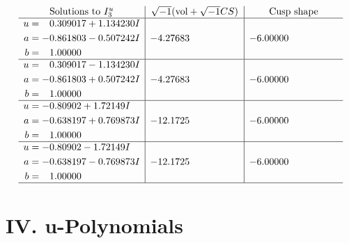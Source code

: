 \documentclass[1p]{elsarticle_modified}
\theoremstyle{definition}
\newcommand{\I}{\sqrt{-1}}
\begin{document}
$$\begin{array}{c|c|c}  
\text{Solutions to }I^u_{3}& \I (\text{vol} + \sqrt{-1}CS) & \text{Cusp shape}\\
 \hline 
\begin{aligned}
u &= \phantom{-}0.309017 + 1.134230 I \\
a &= -0.861803 - 0.507242 I \\
b &= \phantom{-}1.00000\phantom{ +0.000000I}\end{aligned}
 & -4.27683\phantom{ +0.000000I} & -6.00000\phantom{ +0.000000I} \\ \hline\begin{aligned}
u &= \phantom{-}0.309017 - 1.134230 I \\
a &= -0.861803 + 0.507242 I \\
b &= \phantom{-}1.00000\phantom{ +0.000000I}\end{aligned}
 & -4.27683\phantom{ +0.000000I} & -6.00000\phantom{ +0.000000I} \\ \hline\begin{aligned}
u &= -0.80902 + 1.72149 I \\
a &= -0.638197 + 0.769873 I \\
b &= \phantom{-}1.00000\phantom{ +0.000000I}\end{aligned}
 & -12.1725\phantom{ +0.000000I} & -6.00000\phantom{ +0.000000I} \\ \hline\begin{aligned}
u &= -0.80902 - 1.72149 I \\
a &= -0.638197 - 0.769873 I \\
b &= \phantom{-}1.00000\phantom{ +0.000000I}\end{aligned}
 & -12.1725\phantom{ +0.000000I} & -6.00000\phantom{ +0.000000I}\\
 \hline 
 \end{array}$$\newpage
\newpage\renewcommand{\arraystretch}{1}
\centering \section*{ IV. u-Polynomials}
\end{document}
